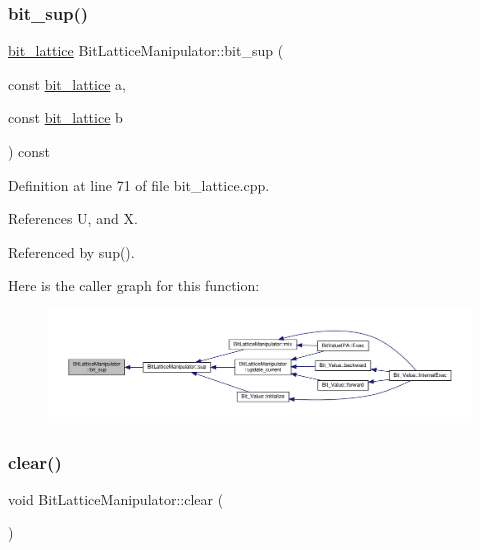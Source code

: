 \subsubsection{\texorpdfstring{bit\+\_\+sup()}{bit\_sup()}}
{\footnotesize\ttfamily \hyperlink{bit__lattice_8hpp_ab732360111c810c4eaeb4c8b81d160d6}{bit\+\_\+lattice} Bit\+Lattice\+Manipulator\+::bit\+\_\+sup (\begin{DoxyParamCaption}\item[{const \hyperlink{bit__lattice_8hpp_ab732360111c810c4eaeb4c8b81d160d6}{bit\+\_\+lattice}}]{a,  }\item[{const \hyperlink{bit__lattice_8hpp_ab732360111c810c4eaeb4c8b81d160d6}{bit\+\_\+lattice}}]{b }\end{DoxyParamCaption}) const\hspace{0.3cm}{\ttfamily [protected]}}



Definition at line 71 of file bit\+\_\+lattice.\+cpp.



References U, and X.



Referenced by sup().

Here is the caller graph for this function\+:
\nopagebreak
\begin{figure}[H]
\begin{center}
\leavevmode
\includegraphics[width=350pt]{dd/d98/classBitLatticeManipulator_adeb8cad98cb703dfa33e6d0170edf096_icgraph}
\end{center}
\end{figure}
\mbox{\label{classBitLatticeManipulator_a42eb6c4e6540a538398764f35761dbe3}} 
\subsubsection{\texorpdfstring{clear()}{clear()}}
{\footnotesize\ttfamily void Bit\+Lattice\+Manipulator\+::clear (\begin{DoxyParamCaption}{ }\end{DoxyParamCaption})\hspace{0.3cm}{\ttfamily [protected]}}



